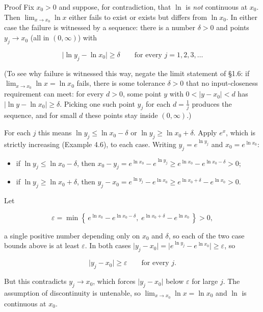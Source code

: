 \documentclass[a4paper,12pt,oneside]{memoir}
\begin{document}
\begin{envproof}{Proof}{}{}
Fix \(x_{0} > 0\) and suppose, for contradiction, that \(\ln\) is \emph{not} continuous at \(x_{0}\). Then \(\lim_{x \to x_{0}} \ln x\) either fails to exist or exists but differs from \(\ln x_{0}\). In either case the failure is witnessed by a sequence: there is a number \(\delta > 0\) and points \(y_{j} \to x_{0}\) (all in \((0, \infty)\)) with

\[ \lvert \ln y_{j} - \ln x_{0} \rvert \ge \delta \qquad \text{for every } j = 1, 2, 3, \dots \]

(To see why failure is witnessed this way, negate the limit statement of §1.6: if \(\lim_{x \to x_{0}} \ln x = \ln x_{0}\) fails, there is some tolerance \(\delta > 0\) that no input-closeness requirement can meet: for every \(d > 0\), some point \(y\) with \(0 < \lvert y - x_{0} \rvert < d\) has \(\lvert \ln y - \ln x_{0} \rvert \ge \delta\). Picking one such point \(y_{j}\) for each \(d = \tfrac{1}{j}\) produces the sequence, and for small \(d\) these points stay inside \((0, \infty)\).)

For each \(j\) this means \(\ln y_{j} \le \ln x_{0} - \delta\) or \(\ln y_{j} \ge \ln x_{0} + \delta\). Apply \(e^{x}\), which is strictly increasing (Example 4.6), to each case. Writing \(y_{j} = e^{\ln y_{j}}\) and \(x_{0} = e^{\ln x_{0}}\):

\begin{itemize}
  \item if \(\ln y_{j} \le \ln x_{0} - \delta\), then \(x_{0} - y_{j} = e^{\ln x_{0}} - e^{\ln y_{j}} \ge e^{\ln x_{0}} - e^{\ln x_{0} - \delta} > 0\);
  \item if \(\ln y_{j} \ge \ln x_{0} + \delta\), then \(y_{j} - x_{0} = e^{\ln y_{j}} - e^{\ln x_{0}} \ge e^{\ln x_{0} + \delta} - e^{\ln x_{0}} > 0\).
\end{itemize}
Let

\[ \varepsilon = \min\!\left\{\, e^{\ln x_{0}} - e^{\ln x_{0} - \delta}, \; e^{\ln x_{0} + \delta} - e^{\ln x_{0}} \,\right\} > 0, \]

a single positive number depending only on \(x_{0}\) and \(\delta\), so each of the two case bounds above is at least \(\varepsilon\). In both cases \(\lvert y_{j} - x_{0} \rvert = \lvert e^{\ln y_{j}} - e^{\ln x_{0}} \rvert \ge \varepsilon\), so

\[ \lvert y_{j} - x_{0} \rvert \ge \varepsilon \qquad \text{for every } j. \]

But this contradicts \(y_{j} \to x_{0}\), which forces \(\lvert y_{j} - x_{0} \rvert\) below \(\varepsilon\) for large \(j\). The assumption of discontinuity is untenable, so \(\lim_{x \to x_{0}} \ln x = \ln x_{0}\) and \(\ln\) is continuous at \(x_{0}\). \qedmark
\end{envproof}
\end{document}
